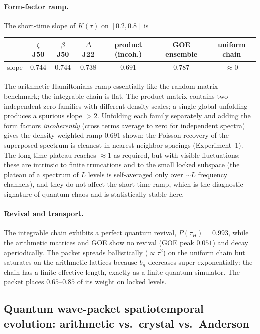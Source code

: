 \documentclass[aps,prx,reprint,floatfix]{revtex4-2}
\begin{document}
\paragraph{Form-factor ramp.}
The short-time slope of $K(\tau)$ on $[0.2,0.8]$ is
\begin{center}
\small
\begin{tabular}{lcccccc}
\toprule
 & $\zeta$ J50 & $\beta$ J50 & $\Delta$ J22 & product (incoh.) & GOE ensemble & uniform chain\\
\midrule
slope & $0.744$ & $0.744$ & $0.738$ & $0.691$ & $0.787$ & $\approx0$\\
\bottomrule
\end{tabular}
\end{center}
The arithmetic Hamiltonians ramp essentially like the random-matrix
benchmark; the integrable chain is flat. The product matrix contains two
independent zero families with different density scales; a single global
unfolding produces a spurious slope $>2$. Unfolding each family separately
and adding the form factors \emph{incoherently} (cross terms average to zero
for independent spectra) gives the density-weighted ramp $0.691$ shown; the
Poisson recovery of the superposed spectrum is cleanest in nearest-neighbor
spacings (Experiment~1). The long-time plateau reaches $\approx1$ as
required, but with visible fluctuations; these are intrinsic to finite
truncations and to the small locked subspace (the plateau of a spectrum of
$L$ levels is self-averaged only over $\sim L$ frequency channels), and they
do not affect the short-time ramp, which is the diagnostic signature of
quantum chaos and is statistically stable here.

\paragraph{Revival and transport.}
The integrable chain exhibits a perfect quantum revival,
$P(\tau_H)=0.993$, while the arithmetic matrices and GOE show no revival
(GOE peak $0.051$) and decay aperiodically. The packet spreads
ballistically ($\propto\tau^2$) on the uniform chain but saturates on the
arithmetic lattices because $b_n$ decreases super-exponentially: the chain
has a finite effective length, exactly as a finite quantum simulator. The
packet places $0.65$--$0.85$ of its weight on locked levels.

\subsection{Quantum wave-packet spatiotemporal evolution: arithmetic vs.\ crystal vs.\ Anderson}
\label{sec:evolution-compare}
\end{document}
